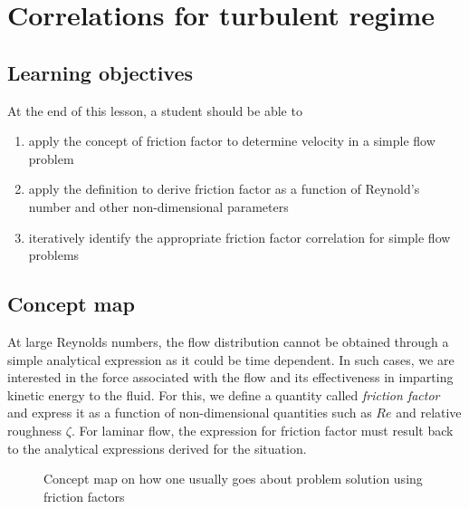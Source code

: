 \chapter{Correlations for turbulent regime}
\label{ch:turbulent}

\section{Learning objectives}

At the end of this lesson, a student should be able to
\begin{enumerate}
\item apply the concept of friction factor to determine velocity in a simple flow problem
\item apply the definition to derive friction factor as a function of Reynold's number and other non-dimensional parameters
\item iteratively identify the appropriate friction factor correlation for simple flow problems
\end{enumerate}

\section{Concept map}

At large Reynolds numbers, the flow distribution cannot be obtained through a simple analytical expression as it could be time dependent. In such cases, we are interested in the force associated with the flow and its effectiveness in imparting kinetic energy to the fluid. For this, we define a quantity called \textit{friction factor} and express it as a function of non-dimensional quantities such as $Re$ and relative roughness $\zeta$. For laminar flow, the expression for friction factor must result back to the analytical expressions derived for the situation.


\begin{figure}[h]
\begin{center}
\end{center}
\caption{Concept map on how one usually goes about problem solution using friction factors}
\label{FrictionFactorConceptMap}
\end{figure}



